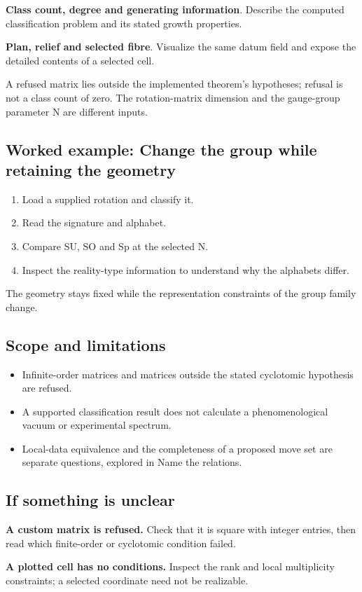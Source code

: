 \documentclass[11pt,a4paper]{article}
\begin{document}
\textbf{Class count, degree and generating information}. Describe the computed classification problem and its stated growth properties.

\textbf{Plan, relief and selected fibre}. Visualize the same datum field and expose the detailed contents of a selected cell.

A refused matrix lies outside the implemented theorem's hypotheses; refusal is not a class count of zero. The rotation-matrix dimension and the gauge-group parameter N are different inputs.
\subsection*{Worked example: Change the group while retaining the geometry}
\begin{enumerate}
\item Load a supplied rotation and classify it.
\item Read the signature and alphabet.
\item Compare SU, SO and Sp at the selected N.
\item Inspect the reality-type information to understand why the alphabets differ.
\end{enumerate}
The geometry stays fixed while the representation constraints of the group family change.
\subsection*{Scope and limitations}
\begin{itemize}
\item Infinite-order matrices and matrices outside the stated cyclotomic hypothesis are refused.
\item A supported classification result does not calculate a phenomenological vacuum or experimental spectrum.
\item Local-data equivalence and the completeness of a proposed move set are separate questions, explored in Name the relations.
\end{itemize}
\subsection*{If something is unclear}
\textbf{A custom matrix is refused.} Check that it is square with integer entries, then read which finite-order or cyclotomic condition failed.

\textbf{A plotted cell has no conditions.} Inspect the rank and local multiplicity constraints; a selected coordinate need not be realizable.
\end{document}
